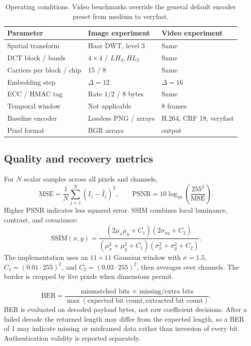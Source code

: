 \documentclass[11pt,a4paper]{article}
\newcommand{\code}[1]{\texttt{\detokenize{#1}}}
\begin{document}
\begin{table}[H]\centering\footnotesize
\begin{tabular}{lll}\toprule
Parameter & Image experiment & Video experiment \\\midrule
Spatial transform & Haar DWT, level 3 & Same \\
DCT block / bands & $4\times4$ / $LH_3,HL_3$ & Same \\
Carriers per block / chip & 15 / 8 & Same \\
Embedding step & $\Delta=12$ & $\Delta=16$ \\
ECC / HMAC tag & Rate $1/2$ / 8 bytes & Same \\
Temporal window & Not applicable & 8 frames \\
Baseline encoder & Lossless PNG / arrays & H.264, CRF 18, veryfast \\
Pixel format & BGR arrays & \code{yuv420p} output \\
\bottomrule\end{tabular}
\caption{Operating conditions. Video benchmarks override the general default encoder preset from medium to veryfast.}
\end{table}

\subsection{Quality and recovery metrics}
For $N$ scalar samples across all pixels and channels,
\begin{equation}
\mathrm{MSE}=\frac{1}{N}\sum_{j=1}^{N}(I_j-\widehat I_j)^2,
\qquad \mathrm{PSNR}=10\log_{10}\!\left(\frac{255^2}{\mathrm{MSE}}\right).
\end{equation}
Higher PSNR indicates less squared error. SSIM combines local luminance, contrast, and covariance:
\begin{equation}
\mathrm{SSIM}(x,y)=
\frac{(2\mu_x\mu_y+C_1)(2\sigma_{xy}+C_2)}
{(\mu_x^2+\mu_y^2+C_1)(\sigma_x^2+\sigma_y^2+C_2)}.
\end{equation}
The implementation uses an $11\times11$ Gaussian window with $\sigma=1.5$,
$C_1=(0.01\cdot255)^2$, and $C_2=(0.03\cdot255)^2$, then averages over channels.
The border is cropped by five pixels when dimensions permit.

\begin{equation}
\mathrm{BER}=\frac{\text{mismatched bits + missing/extra bits}}
{\max(\text{expected bit count},\text{extracted bit count})}.
\end{equation}
BER is evaluated on decoded payload bytes, not raw coefficient decisions. After a
failed decode the returned length may differ from the expected length, so a BER of
1 may indicate missing or misframed data rather than inversion of every bit.
Authentication validity is reported separately.
\end{document}

